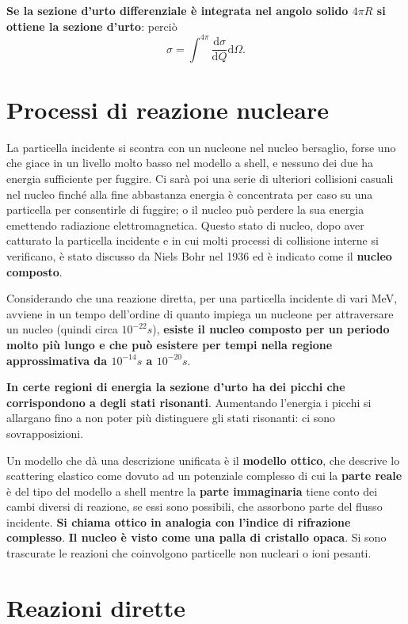 \documentclass[a4paper,11pt,twoside,openany]{book}
\theoremstyle{definition}
\theoremstyle{plain}
\theoremstyle{plain}
\theoremstyle{definition}
\begin{document}
\textbf{Se la sezione d'urto differenziale è integrata nel angolo solido $4\pi R$ si ottiene la sezione d'urto}: perciò
\begin{equation}
\sigma=\int^{4\pi}{\frac{\textrm{d}\sigma}{\textrm{d}Q}\textrm{d}\Omega}.
\end{equation}

\section{Processi di reazione nucleare} %
La particella incidente si scontra con un nucleone nel nucleo bersaglio, forse uno che giace in un livello molto basso nel modello a shell, e nessuno dei due ha energia sufficiente per fuggire. Ci sarà poi una serie di ulteriori collisioni casuali nel nucleo finché alla fine abbastanza energia è concentrata per caso su una particella per consentirle di fuggire; o il nucleo può perdere la sua energia emettendo radiazione elettromagnetica. Questo stato di nucleo, dopo aver catturato la particella incidente e in cui molti processi di collisione interne si verificano, è stato discusso da Niels Bohr nel 1936 ed è indicato come il \textbf{nucleo composto}.

Considerando che una reazione diretta, per una particella incidente di vari \si{MeV}, avviene in un tempo dell'ordine di quanto impiega un nucleone per attraversare un nucleo (quindi circa $\si{10^{-22}}{s}$), \textbf{esiste il nucleo composto per un periodo molto più lungo e che può esistere per tempi nella regione approssimativa da $\si{10^{-14}}{s}$ a $\si{10^{-20}}{s}$}.

\textbf{In certe regioni di energia la sezione d'urto ha dei picchi che corrispondono a degli stati risonanti}. Aumentando l'energia i picchi si allargano fino a non poter più distinguere gli stati risonanti: ci sono sovrapposizioni.

Un modello che dà una descrizione unificata è il \textbf{modello ottico}, che descrive lo scattering elastico come dovuto ad un potenziale complesso di cui la \textbf{parte reale} è del tipo del modello a shell mentre la \textbf{parte immaginaria} tiene conto dei cambi diversi di reazione, se essi sono possibili, che assorbono parte del flusso incidente. \textbf{Si chiama ottico in analogia con l'indice di rifrazione complesso}. \textbf{Il nucleo è visto come una palla di cristallo opaca}. Si sono trascurate le reazioni che coinvolgono particelle non nucleari o ioni pesanti.

\section{Reazioni dirette} %
\end{document}
